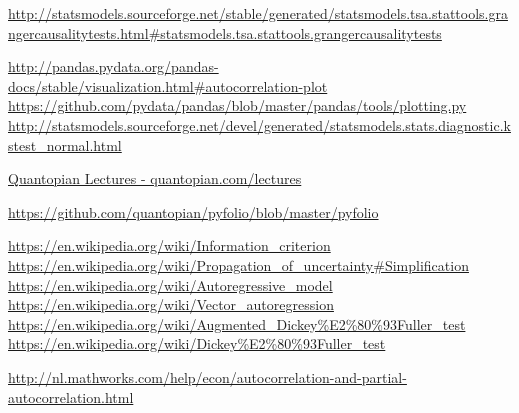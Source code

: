 \documentclass[11pt]{article}
\begin{document}
\begin{thebibliography}{1}
 \href{http://statsmodels.sourceforge.net/stable/generated/statsmodels.tsa.stattools.grangercausalitytests.html\#statsmodels.tsa.stattools.grangercausalitytests}{http://statsmodels.sourceforge.net/stable/generated/statsmodels.tsa.stattools.grangercausalitytests.html\#statsmodels.tsa.stattools.grangercausalitytests}

 \href{http://pandas.pydata.org/pandas-docs/stable/visualization.html\#autocorrelation-plot}{http://pandas.pydata.org/pandas-docs/stable/visualization.html\#autocorrelation-plot}
 \href{https://github.com/pydata/pandas/blob/master/pandas/tools/plotting.py}{https://github.com/pydata/pandas/blob/master/pandas/tools/plotting.py}
 \href{http://statsmodels.sourceforge.net/devel/generated/statsmodels.stats.diagnostic.kstest\_normal.html}{http://statsmodels.sourceforge.net/devel/generated/statsmodels.stats.diagnostic.kstest\_normal.html}

 \href{https://www.quantopian.com/lectures}{Quantopian Lectures - quantopian.com/lectures}

 \href{https://github.com/quantopian/pyfolio/blob/master/pyfolio}{https://github.com/quantopian/pyfolio/blob/master/pyfolio}

 \href{https://en.wikipedia.org/wiki/Information\_criterion}{https://en.wikipedia.org/wiki/Information\_criterion}
 \href{https://en.wikipedia.org/wiki/Propagation\_of\_uncertainty\#Simplification}{https://en.wikipedia.org/wiki/Propagation\_of\_uncertainty\#Simplification}
 \href{https://en.wikipedia.org/wiki/Autoregressive\_model}{https://en.wikipedia.org/wiki/Autoregressive\_model}
 \href{https://en.wikipedia.org/wiki/Vector\_autoregression}{https://en.wikipedia.org/wiki/Vector\_autoregression}
 \href{https://en.wikipedia.org/wiki/Augmented\_Dickey\%E2\%80\%93Fuller\_test}{https://en.wikipedia.org/wiki/Augmented\_Dickey\%E2\%80\%93Fuller\_test}
 \href{https://en.wikipedia.org/wiki/Dickey\%E2\%80\%93Fuller\_test}{https://en.wikipedia.org/wiki/Dickey\%E2\%80\%93Fuller\_test}



 \href{http://nl.mathworks.com/help/econ/autocorrelation-and-partial-autocorrelation.html}{http://nl.mathworks.com/help/econ/autocorrelation-and-partial-autocorrelation.html}


\end{thebibliography}
\end{document}

